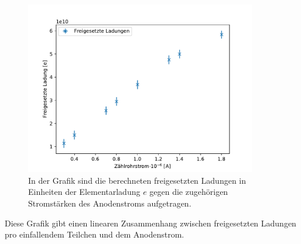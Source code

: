 \documentclass[titlepage = firstcover]{scrartcl}
\begin{document}
                 \begin{figure}[h]
                   \centering
                   \includegraphics[width = 0.9\textwidth]{Ladungen.pdf}
                   \caption{In der Grafik sind die berechneten freigesetzten Ladungen in Einheiten der Elementarladung $e$ gegen die zugehörigen Stromstärken des Anodenstroms aufgetragen.}
                   \label{fig:Ladungen}
                 \end{figure}
             
            \FloatBarrier

            \noindent
            Diese Grafik gibt einen linearen Zusammenhang zwischen freigesetzten Ladungen pro einfallendem Teilchen und dem Anodenstrom.
        
\end{document}
